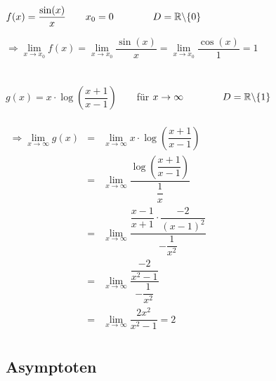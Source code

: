 \documentclass[main.tex]{subfiles}
\begin{document}
\begin{Beispiel}
	$f(x) = \dfrac{\sin(x)}{x} \qquad x_{0} = 0\qquad \qquad D=\mathbb{R}\backslash\{0\}$

	$\Rightarrow \lim\limits_{x \rightarrow x_{0}}f(x) = \lim\limits_{x \rightarrow x_{0}}\dfrac{\sin(x)}{x} = \lim\limits_{x \rightarrow x_{0}} \dfrac{\cos(x)}{1} = 1 $\\\\ \\

	$g(x) = x\cdot \log \left( \dfrac{x+1}{x-1} \right) \qquad $für $ x\to \infty \qquad \qquad D=\mathbb{R}\backslash\{1\}$ \\\\
	$\begin{array}{rcl}
		\Rightarrow \lim\limits_{x \to \infty} g(x) & = & \lim\limits_{x \to \infty} x\cdot \log \left( \dfrac{x+1}{x-1} \right) \\
		&=& \lim\limits_{x \to \infty} \dfrac{\log \left( \dfrac{x+1}{x-1} \right) }{\dfrac{1}{x}}\\
		&=& \lim\limits_{x \to \infty} \dfrac{\dfrac{x-1}{x+1} \cdot \dfrac{-2}{(x-1)^2}}{-\dfrac{1}{x^2}}\\
		&=& \lim\limits_{x \to \infty} \dfrac{\dfrac{-2}{x^2-1}}{-\dfrac{1}{x^2}}\\
		&=& \lim\limits_{x \to \infty} \dfrac{2x^2}{x^2-1} = 2 \\
	\end{array}$
\end{Beispiel}


\subsection{Asymptoten}
\end{document}

